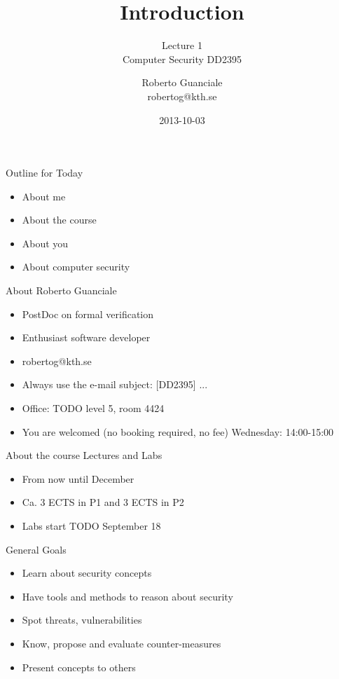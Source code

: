 \documentclass{beamer}
\title{Introduction}
\subtitle{Lecture 1 \\ Computer Security DD2395}
\author[R. Guanciale]{
  Roberto Guanciale\\
  robertog@kth.se
}
\date{2013-10-03}
\newcommand{\todo}[1]{\alert{TODO #1}}
\begin{document}
\begin{frame}[plain]
  \titlepage
\end{frame}

\begin{frame}{Outline for Today}
  \begin{itemize}
    \item About me
    \item About the course
    \item About you
    \item About computer security
  \end{itemize}
\end{frame}

\begin{frame}{About Roberto Guanciale}
  \begin{itemize}
    \item PostDoc on formal verification
    \item Enthusiast software developer
    \item robertog@kth.se
    \item \alert{Always} use the e-mail subject: [DD2395] ...
    \item Office: \todo{level 5, room 4424}
    \item You are welcomed (no booking required, no fee) Wednesday:
      14:00-15:00
  \end{itemize}
\end{frame}

\begin{frame}{About the course}
  Lectures and Labs
  \begin{itemize}
    \item From now until December
    \item Ca. 3 ECTS in P1 and 3 ECTS in P2
    \item Labs start \todo{September 18}
  \end{itemize}
\end{frame}

\begin{frame}{General Goals}
  \begin{itemize}
    \item Learn about security concepts
    \item Have tools and methods to reason about security
    \item Spot threats, vulnerabilities
    \item Know, propose and evaluate counter-measures
    \item Present concepts to others 
  \end{itemize}
\end{frame}
\end{document}
